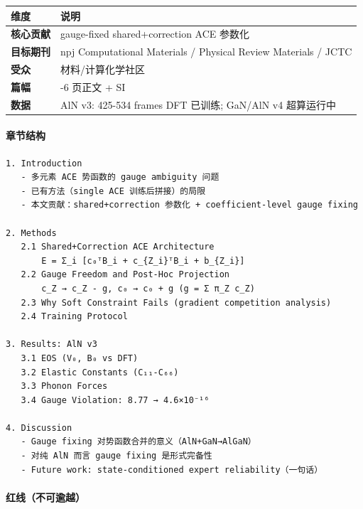 \documentclass[
  12pt,
]{ctexart}
\begin{document}
\begin{longtable}[]{@{}
  >{\raggedright\arraybackslash}p{}
  >{\raggedright\arraybackslash}p{}@{}}
\toprule\noalign{}
\begin{minipage}[b]{\linewidth}\raggedright
维度
\end{minipage} & \begin{minipage}[b]{\linewidth}\raggedright
说明
\end{minipage} \\
\midrule\noalign{}
\endhead
\bottomrule\noalign{}
\endlastfoot
\textbf{核心贡献} & gauge-fixed shared+correction ACE 参数化 \\
\textbf{目标期刊} & npj Computational Materials / Physical Review
Materials / JCTC \\
\textbf{受众} & 材料/计算化学社区 \\
\textbf{篇幅} & 4-6 页正文 + SI \\
\textbf{数据} & AlN v3: 425-534 frames DFT 已训练; GaN/AlN v4
超算运行中 \\
\end{longtable}

\paragraph{章节结构}\label{ux7ae0ux8282ux7ed3ux6784}

\begin{verbatim}
1. Introduction
   - 多元素 ACE 势函数的 gauge ambiguity 问题
   - 已有方法（single ACE 训练后拼接）的局限
   - 本文贡献：shared+correction 参数化 + coefficient-level gauge fixing

2. Methods
   2.1 Shared+Correction ACE Architecture
       E = Σ_i [c₀ᵀB_i + c_{Z_i}ᵀB_i + b_{Z_i}]
   2.2 Gauge Freedom and Post-Hoc Projection
       c_Z → c_Z - g, c₀ → c₀ + g (g = Σ π_Z c_Z)
   2.3 Why Soft Constraint Fails (gradient competition analysis)
   2.4 Training Protocol

3. Results: AlN v3
   3.1 EOS (V₀, B₀ vs DFT)
   3.2 Elastic Constants (C₁₁-C₆₆)
   3.3 Phonon Forces
   3.4 Gauge Violation: 8.77 → 4.6×10⁻¹⁶

4. Discussion
   - Gauge fixing 对势函数合并的意义（AlN+GaN→AlGaN）
   - 对纯 AlN 而言 gauge fixing 是形式完备性
   - Future work: state-conditioned expert reliability（一句话）
\end{verbatim}

\paragraph{红线（不可逾越）}\label{ux7ea2ux7ebfux4e0dux53efux903eux8d8a}
\end{document}
